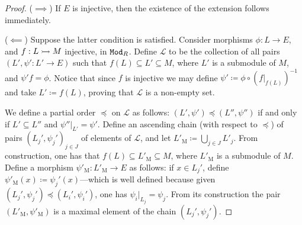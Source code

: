 \begin{proof}
    (\(\implies\)) If \(E\) is injective, then the existence of the extension
    follows immediately.

    (\(\impliedby\)) Suppose the latter condition is satisfied. Consider morphisms
    \(\phi: L \to E\), and \(f: L \rightarrowtail M\) injective, in \({\texttt{Mod}_{R}}\). Define
    \(\mathcal{L}\) to be the collection of all pairs \((L', \psi': L' \to E)\) such
    that \(f(L) \subseteq L' \subseteq M\), where \(L'\) is a submodule of \(M\),
    and \(\psi' f = \phi\). Notice that since \(f\) is injective we may define
    \(\psi' \coloneq \phi \circ (f|_{f(L)})^{-1}\) and take \(L' \coloneq f(L)\),
    proving that \(\mathcal{L}\) is a non-empty set.

    We define a partial order \(\preceq\) on \(\mathcal{L}\) as follows:
    \((L', \psi') \preceq (L'', \psi'')\) if and only if \(L' \subseteq L''\) and
    \(\psi''|_{L'} = \psi'\). Define an ascending chain (with respect to
    \(\preceq\)) of pairs \((L_j', \psi_j')_{j \in J}\) of elements of
    \(\mathcal{L}\), and let \(L'_{\text{M}} \coloneq \bigcup_{j \in J} L'_j\). From
    construction, one has that \(f(L) \subseteq L'_{\text{M}} \subseteq M\), where
    \(L'_{\text{M}}\) is a submodule of \(M\). Define a morphism
    \(\psi'_{\text{M}}: L'_{\text{M}} \to E\) as follows: if \(x \in L_j'\), define
    \(\psi'_{\text{M}}(x) \coloneq \psi_j'(x)\)---which is well defined because
    given \((L_j', \psi_j') \preceq (L_i', \psi_i')\), one has
    \(\psi_i|_{L_j} = \psi_j\). From its construction the pair
    \((L'_{\text{M}}, \psi'_{\text{M}})\) is a maximal element of the chain
    \((L_j', \psi_j')\).


\end{proof}
